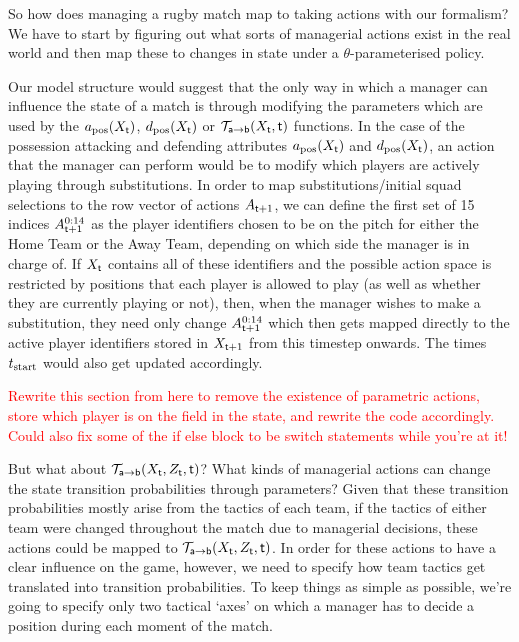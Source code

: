 So how does managing a rugby match map to taking actions with our formalism? We have to start by figuring out what sorts of managerial actions exist in the real world and then map these to changes in state under a $\theta$-parameterised policy. 

Our model structure would suggest that the only way in which a manager can influence the state of a match is through modifying the parameters which are used by the $a_{\rm pos}(X_{\sf t})$, $d_{\rm pos}(X_{\sf t})$ or ${\cal T}_{{\sf a}\rightarrow {\sf b}}(X_{\sf t},{\sf t})$ functions. In the case of the possession attacking and defending attributes $a_{\rm pos}(X_{\sf t})$ and $d_{\rm pos}(X_{\sf t})$, an action that the manager can perform would be to modify which players are actively playing through substitutions. In order to map substitutions/initial squad selections to the row vector of actions $A_{{\sf t}+1}$, we can define the first set of 15 indices $A_{{\sf t}+1}^{0:14}$ as the player identifiers chosen to be on the pitch for either the {\sf Home Team} or the {\sf Away Team}, depending on which side the manager is in charge of. If $X_{\sf t}$ contains all of these identifiers and the possible action space is restricted by positions that each player is allowed to play (as well as whether they are currently playing or not), then, when the manager wishes to make a substitution, they need only change $A_{{\sf t}+1}^{0:14}$ which then gets mapped directly to the active player identifiers stored in $X_{{\sf t}+1}$ from this timestep onwards. The times $t_{\rm start}$ would also get updated accordingly.

\textcolor{red}{Rewrite this section from here to remove the existence of parametric actions, store which player is on the field in the state, and rewrite the code accordingly. Could also fix some of the if else block to be switch statements while you're at it!}

But what about ${\cal T}_{{\sf a}\rightarrow {\sf b}}(X_{\sf t},Z_{\sf t},{\sf t})$? What kinds of managerial actions can change the state transition probabilities through parameters? Given that these transition probabilities mostly arise from the tactics of each team, if the tactics of either team were changed throughout the match due to managerial decisions, these actions could be mapped to ${\cal T}_{{\sf a}\rightarrow {\sf b}}(X_{\sf t},Z_{\sf t},{\sf t})$. In order for these actions to have a clear influence on the game, however, we need to specify how team tactics get translated into transition probabilities. To keep things as simple as possible, we're going to specify only two tactical `axes' on which a manager has to decide a position during each moment of the match.

